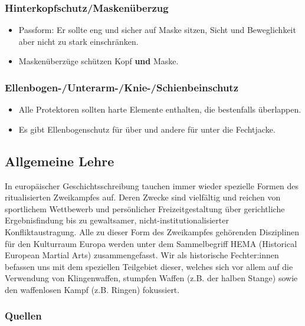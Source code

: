 \subsubsection*{Hinterkopfschutz/Maskenüberzug}

\begin{itemize}
    \item Passform: Er sollte eng und sicher auf Maske sitzen, Sicht und Beweglichkeit aber nicht zu stark einschränken.
    \item Maskenüberzüge schützen Kopf \textbf{und} Maske.
\end{itemize}

\subsubsection*{Ellenbogen-/Unterarm-/Knie-/Schienbeinschutz}

\begin{itemize}
    \item Alle Protektoren sollten harte Elemente enthalten, die bestenfalls überlappen.
    \item Es gibt Ellenbogenschutz für über und andere für unter die Fechtjacke.
\end{itemize}

\newpage

\subsection{Allgemeine Lehre}

In europäischer Geschichtsschreibung tauchen immer wieder spezielle Formen des ritualisierten Zweikampfes auf.
Deren Zwecke sind vielfältig und reichen von sportlichem Wettbewerb und persönlicher Freizeitgestaltung über gerichtliche Ergebnisfindung bis zu gewaltsamer, nicht-institutionalisierter Konfliktaustragung.
Alle zu dieser Form des Zweikampfes gehörenden Disziplinen für den Kulturraum Europa werden unter dem Sammelbegriff HEMA (Historical European Martial Arts) zusammengefasst.
Wir als historische Fechter:innen befassen uns mit dem speziellen Teilgebiet dieser, welches sich vor allem auf die Verwendung von Klingenwaffen, stumpfen Waffen (z.B. der halben Stange) sowie den waffenlosen Kampf (z.B. Ringen) fokussiert.

\subsubsection{Quellen}

